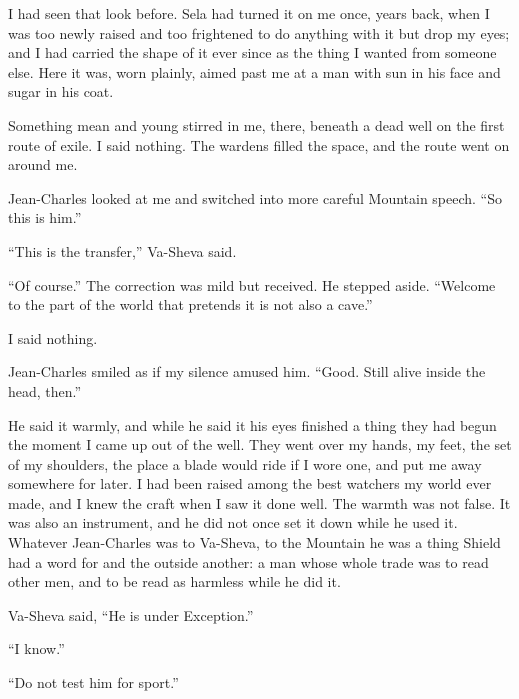 I had seen that look before. Sela had turned it on me once, years back, when I was too newly raised and too frightened to do anything with it but drop my eyes; and I had carried the shape of it ever since as the thing I wanted from someone else. Here it was, worn plainly, aimed past me at a man with sun in his face and sugar in his coat.\par

Something mean and young stirred in me, there, beneath a dead well on the first route of exile. I said nothing. The wardens filled the space, and the route went on around me.\par

Jean-Charles looked at me and switched into more careful Mountain speech. ``So this is him.''\par

``This is the transfer,'' Va-Sheva said.\par

``Of course.'' The correction was mild but received. He stepped aside. ``Welcome to the part of the world that pretends it is not also a cave.''\par

I said nothing.\par

Jean-Charles smiled as if my silence amused him. ``Good. Still alive inside the head, then.''\par

He said it warmly, and while he said it his eyes finished a thing they had begun the moment I came up out of the well. They went over my hands, my feet, the set of my shoulders, the place a blade would ride if I wore one, and put me away somewhere for later. I had been raised among the best watchers my world ever made, and I knew the craft when I saw it done well. The warmth was not false. It was also an instrument, and he did not once set it down while he used it. Whatever Jean-Charles was to Va-Sheva, to the Mountain he was a thing Shield had a word for and the outside another: a man whose whole trade was to read other men, and to be read as harmless while he did it.\par

Va-Sheva said, ``He is under Exception.''\par

``I know.''\par

``Do not test him for sport.''\par

